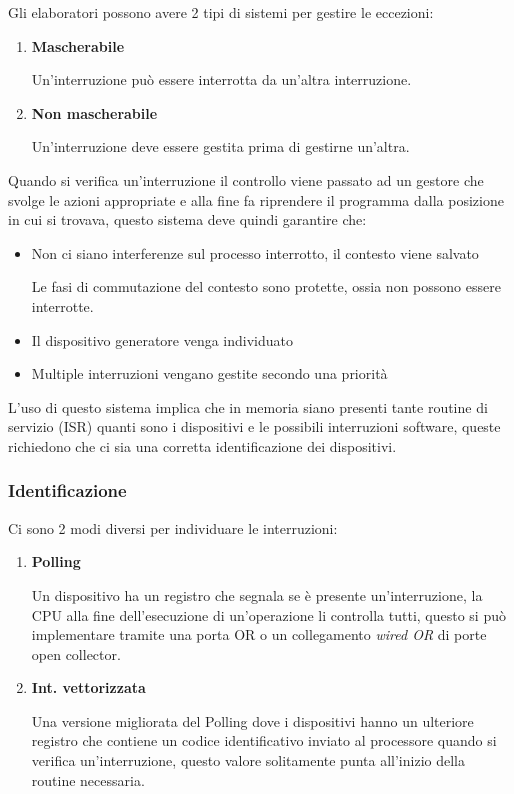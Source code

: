 \documentclass{article}
\begin{document}
\noindent Gli elaboratori possono avere 2 tipi di sistemi per gestire le eccezioni:
\begin{enumerate}
    \item \textbf{Mascherabile}

        Un'interruzione può essere interrotta da un'altra interruzione.
    
    \item \textbf{Non mascherabile}

        Un'interruzione deve essere gestita prima di gestirne un'altra.
    
\end{enumerate}

\vspace{7pt}

\noindent Quando si verifica un'interruzione il controllo viene passato ad un gestore che svolge le azioni appropriate e alla fine fa riprendere il programma dalla posizione in cui si trovava, questo sistema deve quindi garantire che:
\begin{itemize}
    \item Non ci siano interferenze sul processo interrotto, il contesto viene salvato

        Le fasi di commutazione del contesto sono protette, ossia non possono essere interrotte.
    
    \item Il dispositivo generatore venga individuato
    \item Multiple interruzioni vengano gestite secondo una priorità
\end{itemize}

\vspace{7pt}

\noindent L'uso di questo sistema implica che in memoria siano presenti tante routine di servizio (ISR) quanti sono i dispositivi e le possibili interruzioni software, queste richiedono che ci sia una corretta identificazione dei dispositivi. 

\subsubsection{Identificazione}

Ci sono 2 modi diversi per individuare le interruzioni:
\begin{enumerate}
    \item \textbf{Polling}

        Un dispositivo ha un registro che segnala se è presente un'interruzione, la CPU alla fine dell'esecuzione di un'operazione li controlla tutti, questo si può implementare tramite una porta OR o un collegamento \textit{wired OR} di porte open collector.

    \item \textbf{Int. vettorizzata}

        Una versione migliorata del Polling dove i dispositivi hanno un ulteriore registro che contiene un codice identificativo inviato al processore quando si verifica un'interruzione, questo valore solitamente punta all'inizio della routine necessaria.\newline 
        
\end{enumerate}
\end{document}
